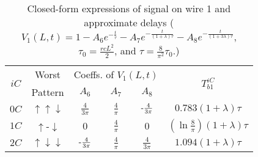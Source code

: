\documentclass[10pt,journal]{IEEEtran}
\def\d{\downarrow}
\def\u{\uparrow}
\begin{document}
\begin{table}[!t]
\caption{Closed-form expressions of signal on wire 1 and approximate delays ($V_1(L,t) = 1-A_6 e^{-\frac{t}{\tau}} - A_7 e^{-\frac{t}{(1+\lambda)\tau}} - A_8 e^{-\frac{t}{(1+3\lambda)\tau}}$, $\tau_0=\frac{rcL^2}{2}$, and $\tau=\frac{8}{\pi^2}\tau_0$.)}\label{tab:wire1}
\begin{center}
\begin{tabular}{|c|c|c|c|c|c|}
\hline
\multirow{2}{*}{$iC$} & Worst & \multicolumn{3}{|c|}{Coeffs. of $V_1(L,t)$} & \multirow{2}{*}{$T_{b1}^{iC}$}\\
\cline{3-5}
& Pattern & $A_6$ & $A_7$ & $A_8$ & \\
\hline
$0C$ & $\u\u\d$ & $\frac{4}{3\pi}$ & $\frac{4}{\pi}$ & $\textnormal{-}\frac{4}{3\pi}$ & $0.783(1+\lambda)\tau$ \\
\hline
$1C$ & $\u$-$\d$ & 0 & $\frac{4}{\pi}$ & 0 & $(\ln \frac{8}{\pi})(1+\lambda)\tau$\\
\hline
$2C$ & $\u\d\d$ & $\textnormal{-}\frac{4}{3\pi}$ & $\frac{4}{\pi}$ & $\frac{4}{3\pi}$ & $1.094(1+\lambda)\tau$ \\
\hline
\end{tabular}
\end{center}
\end{table}
\end{document}
